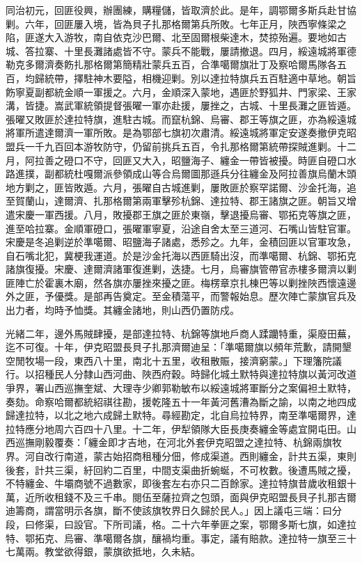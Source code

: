 \begin{pinyinscope}
同治初元，回匪役興，辦團練，購糧儲，皆取濟於此。是年，調鄂爾多斯兵赴甘協剿。六年，回匪屢入境，皆為貝子扎那格爾第兵所敗。七年正月，陜西寧條梁之陷，匪遂大入游牧，南自依克沙巴爾、北至固爾根柴達木，焚掠殆遍。要地如古城、答拉寨、十里長灘諸處皆不守。蒙兵不能戰，屢請撤退。四月，綏遠城將軍德勒克多爾濟奏飭扎那格爾第簡精壯蒙兵五百，合準噶爾旗壯丁及察哈爾馬隊各五百，均歸統帶，擇駐神木要隘，相機迎剿。別以達拉特旗兵五百駐適中草地。朝旨飭寧夏副都統金順一軍援之。六月，金順深入蒙地，遇匪於野狐井、門家梁、王家溝，皆捷。嵩武軍統領提督張曜一軍亦赴援，屢挫之，古城、十里長灘之匪皆遁。張曜又敗匪於達拉特旗，進駐古城。而竄杭錦、烏審、郡王等旗之匪，亦為綏遠城將軍所遣達爾濟一軍所敗。是為鄂部七旗初次肅清。綏遠城將軍定安遂奏撤伊克昭盟兵一千九百回本游牧防守，仍留前挑兵五百，令扎那格爾第統帶探賊進剿。十二月，阿拉善之磴口不守，回匪又大入，昭鹽海子、纏金一帶皆被擾。時匪自磴口水路進撲，副都統杜嘎爾派參領成山等合烏爾圖那遜兵分往纏金及阿拉善旗烏蘭木頭地方剿之，匪皆敗遁。六月，張曜自古城進剿，屢敗匪於察罕諾爾、沙金托海，追至賀蘭山，達爾濟、扎那格爾第兩軍擊殄杭錦、達拉特、郡王諸旗之匪。朝旨又增遣宋慶一軍西援。八月，敗擾郡王旗之匪於東嶺，擊退擾烏審、鄂拓克等旗之匪，進至哈拉寨。金順軍磴口，張曜軍寧夏，沿途自舍太至三道河、石嘴山皆駐官軍。宋慶是冬追剿逆於準噶爾、昭鹽海子諸處，悉殄之。九年，金積回匪以官軍攻急，自石嘴北犯，冀梗我運道。於是沙金托海以西匪騎出沒，而準噶爾、杭錦、鄂拓克諸旗復擾。宋慶、達爾濟諸軍復進剿，迭捷。七月，烏審旗管帶官赤樓多爾濟以剿匪陣亡於霍裏木廟，然各旗亦屢挫來擾之匪。梅楞章京扎棟巴等以剿挫陜西懷遠邊外之匪，予優獎。是部再告奠定。至金積蕩平，而警報始息。歷次陣亡蒙旗官兵及出力者，均時予恤獎。其纏金諸地，則山西仍置防戍。

光緒二年，邊外馬賊肆擾，是部達拉特、杭錦等旗地戶商人蹂躪特重，渠廢田蕪，迄不可復。十年，伊克昭盟長貝子扎那濟爾迪呈：「準噶爾旗以頻年荒歉，請開墾空閒牧場一段，東西八十里，南北十五里，收租散賑，接濟窮蒙。」下理籓院議行。以招種民人分隸山西河曲、陜西府穀。時歸化城土默特與達拉特旗以黃河改道爭界，署山西巡撫奎斌、大理寺少卿郭勒敏布以綏遠城將軍斷分之案偏袒土默特，奏劾。命察哈爾都統紹祺往勘，援乾隆五十一年黃河舊漕為斷之諭，以南之地四成歸達拉特，以北之地六成歸土默特。尋經勘定，北自烏拉特界，南至準噶爾界，達拉特應分地周六百四十八里。十二年，伊犁領隊大臣長庚奏纏金等處宜開屯田。山西巡撫剛毅覆奏：「纏金即才吉地，在河北外套伊克昭盟之達拉特、杭錦兩旗牧界。河自改行南道，蒙古始招商租種分佃，修成渠道。西則纏金，計共五渠，東則後套，計共三渠，紆回約二百里，中間支渠曲折蜿蜒，不可枚數。後遭馬賊之擾，不特纏金、牛壩商號不過數家，即後套左右亦只二百餘家。達拉特旗昔歲收租銀十萬，近所收租錢不及三千串。閱伍至薩拉齊之包頭，面與伊克昭盟長貝子扎那吉爾迪籌商，謂當明示各旗，斷不使該旗牧界日久歸於民人。」因上議屯三端：曰分段，曰修渠，曰設官。下所司議，格。二十六年拳匪之案，鄂爾多斯七旗，如達拉特、鄂拓克、烏審、準噶爾各旗，釀禍均重。事定，議有賠款。達拉特一旗至三十七萬兩。教堂欲得銀，蒙旗欲抵地，久未結。


\end{pinyinscope}
